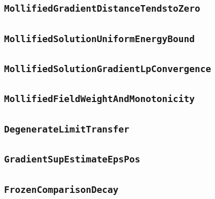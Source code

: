 \documentclass[11pt]{amsart}
\theoremstyle{definition}
\begin{document}
\subsection{\texorpdfstring{\texttt{MollifiedGradientDistanceTendstoZero}}{MollifiedGradientDistanceTendstoZero}}\label{node:MollifiedGradientDistanceTendstoZero}


\subsection{\texorpdfstring{\texttt{MollifiedSolutionUniformEnergyBound}}{MollifiedSolutionUniformEnergyBound}}\label{node:MollifiedSolutionUniformEnergyBound}


\subsection{\texorpdfstring{\texttt{MollifiedSolutionGradientLpConvergence}}{MollifiedSolutionGradientLpConvergence}}\label{node:MollifiedSolutionGradientLpConvergence}


\subsection{\texorpdfstring{\texttt{MollifiedFieldWeightAndMonotonicity}}{MollifiedFieldWeightAndMonotonicity}}\label{node:MollifiedFieldWeightAndMonotonicity}


\subsection{\texorpdfstring{\texttt{DegenerateLimitTransfer}}{DegenerateLimitTransfer}}\label{node:DegenerateLimitTransfer}


\subsection{\texorpdfstring{\texttt{GradientSupEstimateEpsPos}}{GradientSupEstimateEpsPos}}\label{node:GradientSupEstimateEpsPos}


\subsection{\texorpdfstring{\texttt{FrozenComparisonDecay}}{FrozenComparisonDecay}}\label{node:FrozenComparisonDecay}

\end{document}
